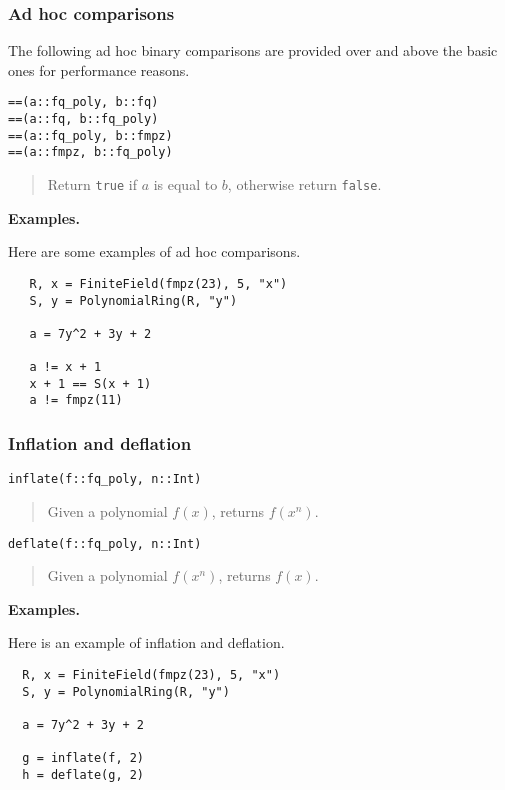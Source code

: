 \documentclass[a4paper,10pt]{article}
\newcommand{\code}{\lstinline}
\newcommand{\desc}[1]{\vspace{-3mm}\begin{quote}#1\end{quote}}
\begin{document}
{{\subsubsection{Ad hoc comparisons}

The following ad hoc binary comparisons are provided over and above the basic ones
for performance reasons.

\begin{lstlisting}
==(a::fq_poly, b::fq)
==(a::fq, b::fq_poly)
==(a::fq_poly, b::fmpz)
==(a::fmpz, b::fq_poly)
\end{lstlisting}

\desc{Return \code{true} if $a$ is equal to $b$, otherwise return \code{false}.}

\textbf{Examples.}

Here are some examples of ad hoc comparisons.

\begin{lstlisting}
   R, x = FiniteField(fmpz(23), 5, "x")
   S, y = PolynomialRing(R, "y")

   a = 7y^2 + 3y + 2

   a != x + 1
   x + 1 == S(x + 1)
   a != fmpz(11)
\end{lstlisting}

\subsubsection{Inflation and deflation}

\begin{lstlisting}
inflate(f::fq_poly, n::Int)
\end{lstlisting}

\desc{Given a polynomial $f(x)$, returns $f(x^n)$.}

\begin{lstlisting}
deflate(f::fq_poly, n::Int)
\end{lstlisting}

\desc{Given a polynomial $f(x^n)$, returns $f(x)$.}

\textbf{Examples.}

Here is an example of inflation and deflation.

\begin{lstlisting}
  R, x = FiniteField(fmpz(23), 5, "x")
  S, y = PolynomialRing(R, "y")

  a = 7y^2 + 3y + 2

  g = inflate(f, 2)
  h = deflate(g, 2)
\end{lstlisting}

}}
\end{document}
